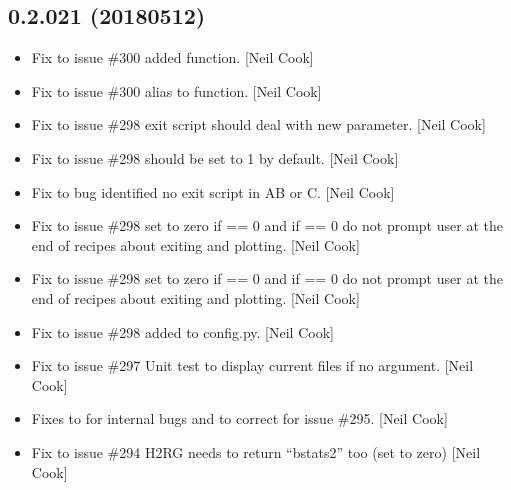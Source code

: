 \documentclass[a4paper,10pt,english]{report}
\begin{document}
\subsection{0.2.021 (2018\sphinxhyphen{}05\sphinxhyphen{}12)}
\label{\detokenize{misc/changelog:id458}}\begin{itemize}
\item {} 
Fix to issue \#300 \sphinxhyphen{} added  function. {[}Neil Cook{]}

\item {} 
Fix to issue \#300 \sphinxhyphen{} alias to  function. {[}Neil Cook{]}

\item {} 
Fix to issue \#298 \sphinxhyphen{} exit script should deal with new 
parameter. {[}Neil Cook{]}

\item {} 
Fix to issue \#298 \sphinxhyphen{}  should be set to 1 by default.
{[}Neil Cook{]}

\item {} 
Fix to bug identified \sphinxhyphen{} no exit script in AB or C. {[}Neil Cook{]}

\item {} 
Fix to issue \#298 \sphinxhyphen{} set  to zero if  == 0 and
if  == 0 do not prompt user at the end of recipes about
exiting and plotting. {[}Neil Cook{]}

\item {} 
Fix to issue \#298 \sphinxhyphen{} set  to zero if  == 0 and
if  == 0 do not prompt user at the end of recipes about
exiting and plotting. {[}Neil Cook{]}

\item {} 
Fix to issue \#298 \sphinxhyphen{} added  to config.py. {[}Neil Cook{]}

\item {} 
Fix to issue \#297 \sphinxhyphen{} Unit test to display current files if no argument.
{[}Neil Cook{]}

\item {} 
Fixes to  for internal bugs and to correct for issue \#295.
{[}Neil Cook{]}

\item {} 
Fix to issue \#294 \sphinxhyphen{} H2RG needs to return “bstats2” too (set to zero)
{[}Neil Cook{]}


\end{itemize}
\end{document}
